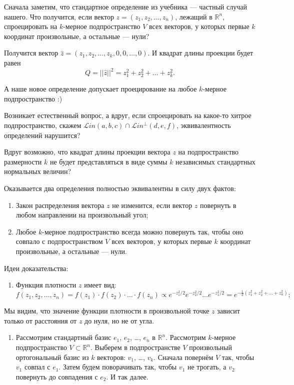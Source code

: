 \documentclass[11pt,russian,]{article}
\providecommand{\tightlist}{%
  \setlength{\itemsep}{0pt}\setlength{\parskip}{0pt}}
\newcommand{\RR}{\mathbb{R}}
\renewcommand{\Rn}{\RR^n}
\newcommand{\1}{\mathbbm{1}}
\newcommand{\Lin}{\mathcal{L}in}
\newcommand{\Linp}{\Lin^{\perp}}
\begin{document}
Сначала заметим, что стандартное определение из учебника --- частный
случай нашего. Что получится, если вектор
\(z = (z_1, z_2, \ldots, z_n)\), лежащий в \(\Rn\), спроецировать на
\(k\)-мерное подпространство \(V\) всех векторов, у которых первые \(k\)
координат произвольные, а остальные --- нули?

Получится вектор \(\hat z = (z_1, z_2, \ldots, z_k, 0, 0, \ldots, 0)\).
И квадрат длины проекции будет равен \[
Q = ||\hat z||^2 = z_1^2 + z_2^2 + \ldots + z_k^2.
\]

А наше новое определение допускает проецирование на любое \(k\)-мерное
подпространство :)

Возникает естественный вопрос, а вдруг, если спроецировать на какое-то
хитрое подпространство, скажем \(\Lin(a, b, c) \cap \Linp (d, e, f)\),
эквивалентность определений нарушится?

Вдруг возможно, что квадрат длины проекции вектора \(z\) на
подпространство размерности \(k\) не будет представляться в виде суммы
\(k\) независимых стандартных нормальных величин?

Оказывается два определения полностью эквивалентны в силу двух фактов:

\begin{enumerate}
\def\labelenumi{\arabic{enumi}.}
\item
  Закон распределения вектора \(z\) не изменится, если вектор \(z\)
  повернуть в любом направлении на произвольный угол;
\item
  Любое \(k\)-мерное подпространство всегда можно повернуть так, чтобы
  оно совпало с подпространством \(V\) всех векторов, у которых первые
  \(k\) координат произвольные, а остальные --- нули.
\end{enumerate}

Идеи доказательства:

\begin{enumerate}
\def\labelenumi{\arabic{enumi}.}
\tightlist
\item
  Функция плотности \(z\) имеет вид: \[
  f(z_1, z_2, \ldots, z_n) = f(z_1) \cdot f(z_2)\cdot \ldots \cdot f(z_n) \propto e^{-z_1^2/2}e^{-z_2^2/2}\ldots e^{-z_1^2/2} = e^{-\frac{1}{2}(z_1^2 + z_2^2 +\ldots +z_n^2)};
  \]
\end{enumerate}

Мы видим, что значение функции плотности в произвольной точке \(z\)
зависит только от расстояния от \(z\) до нуля, но не от угла.

\begin{enumerate}
\def\labelenumi{\arabic{enumi}.}
\setcounter{enumi}{1}
\tightlist
\item
  Рассмотрим стандартный базис \(e_1\), \(e_2\), \ldots, \(e_n\) в
  \(\Rn\). Рассмотрим \(k\)-мерное подпространство \(V \subset \Rn\).
  Выберем в подпространстве \(V\) произвольный ортогональный базис из
  \(k\) векторов: \(v_1\), \ldots, \(v_k\). Сначала повернём \(V\) так,
  чтобы \(v_1\) совпал с \(e_1\). Затем будем поворачивать так, чтобы
  \(v_1\) не трогать, а \(v_2\) повернуть до совпадения с \(e_2\). И так
  далее.
\end{enumerate}
\end{document}
